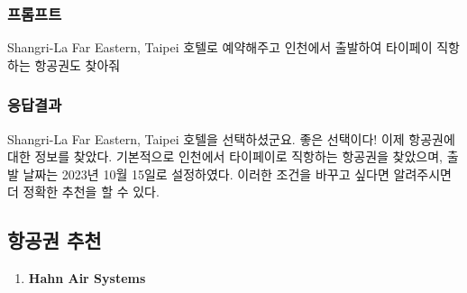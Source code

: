 \documentclass[
  letterpaper,
]{book}
\newenvironment{Shaded}{\begin{snugshade}}{\end{snugshade}}
\newcommand{\NormalTok}[1]{\textcolor[rgb]{0.00,0.23,0.31}{#1}}
\providecommand{\tightlist}{%
  \setlength{\itemsep}{0pt}\setlength{\parskip}{0pt}}\usepackage{longtable,booktabs,array}
\begin{document}
\begin{tcolorbox}[enhanced jigsaw, opacityback=0, opacitybacktitle=0.6, colback=white, rightrule=.15mm, coltitle=black, colframe=quarto-callout-note-color-frame, colbacktitle=quarto-callout-note-color!10!white, bottomrule=.15mm, bottomtitle=1mm, breakable, title=\textcolor{quarto-callout-note-color}{\faInfo}\hspace{0.5em}{호텔선정과 항공권 예매}, titlerule=0mm, leftrule=.75mm, toptitle=1mm, left=2mm, arc=.35mm, toprule=.15mm]

\hypertarget{uxd504uxb86cuxd504uxd2b8-3}{%
\subsubsection*{프롬프트}\label{uxd504uxb86cuxd504uxd2b8-3}}

\begin{Shaded}
\begin{Highlighting}[]
\NormalTok{Shangri{-}La Far Eastern, Taipei 호텔로 예약해주고 인천에서 출발하여 타이페이 직항하는 항공권도 찾아줘}
\end{Highlighting}
\end{Shaded}

\hypertarget{uxc751uxb2f5uxacb0uxacfc-1}{%
\subsubsection*{응답결과}\label{uxc751uxb2f5uxacb0uxacfc-1}}

Shangri-La Far Eastern, Taipei 호텔을 선택하셨군요. 좋은 선택이다! 이제
항공권에 대한 정보를 찾았다. 기본적으로 인천에서 타이페이로 직항하는
항공권을 찾았으며, 출발 날짜는 2023년 10월 15일로 설정하였다. 이러한
조건을 바꾸고 싶다면 알려주시면 더 정확한 추천을 할 수 있다.

\hypertarget{uxd56duxacf5uxad8c-uxcd94uxcc9c}{%
\subsection*{항공권 추천}\label{uxd56duxacf5uxad8c-uxcd94uxcc9c}}

\begin{enumerate}
\def\labelenumi{\arabic{enumi}.}
\tightlist
\item
  \textbf{Hahn Air Systems}


\end{enumerate}
\end{tcolorbox}
\end{document}
